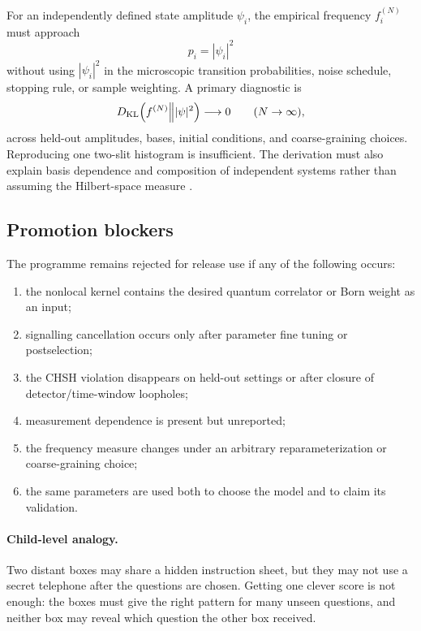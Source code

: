 \documentclass[11pt]{article}
\begin{document}
For an independently defined state amplitude \(\psi_i\), the empirical
frequency \(f_i^{(N)}\) must approach
\begin{equation}
    p_i=|\psi_i|^2
    \label{eq:spec_born_target}
\end{equation}
without using \(|\psi_i|^2\) in the microscopic transition probabilities,
noise schedule, stopping rule, or sample weighting.  A primary diagnostic is
\begin{equation}
    D_{\rm KL}
    \!\left(
        f^{(N)}\middle\| |\psi|^2
    \right)
    \longrightarrow0
    \qquad(N\to\infty),
    \label{eq:spec_born_kl_gate}
\end{equation}
across held-out amplitudes, bases, initial conditions, and coarse-graining
choices.  Reproducing one two-slit histogram is insufficient.  The derivation
must also explain basis dependence and composition of independent systems
rather than assuming the Hilbert-space measure \cite{Born1926}.

\subsection*{Promotion blockers}

The programme remains rejected for release use if any of the following occurs:
\begin{enumerate}
    \item the nonlocal kernel contains the desired quantum correlator or Born
    weight as an input;
    \item signalling cancellation occurs only after parameter fine tuning or
    postselection;
    \item the CHSH violation disappears on held-out settings or after closure of
    detector/time-window loopholes;
    \item measurement dependence is present but unreported;
    \item the frequency measure changes under an arbitrary reparameterization
    or coarse-graining choice;
    \item the same parameters are used both to choose the model and to claim its
    validation.
\end{enumerate}

\paragraph{Child-level analogy.}
Two distant boxes may share a hidden instruction sheet, but they may not use a
secret telephone after the questions are chosen.  Getting one clever score is
not enough: the boxes must give the right pattern for many unseen questions,
and neither box may reveal which question the other box received.
\end{document}
